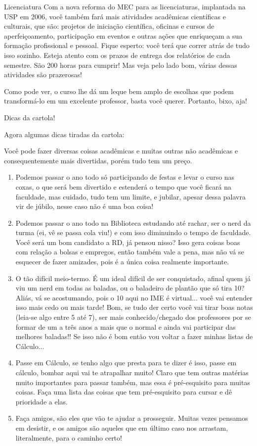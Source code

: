 \begin{subsecao}{Licenciatura}
Com a nova reforma do MEC para as licenciaturas, implantada na USP em 2006,
você também fará mais atividades acadêmicas científicas e culturais, que são:
projetos de iniciação científica, oficinas e cursos de aperfeiçoamento,
participação em eventos e outras ações que enriqueçam a sua formação
profissional e pessoal. Fique esperto: você terá que correr atrás de tudo isso
sozinho. Esteja atento com os prazos de entrega dos relatórios de cada
semestre. São 200 horas para cumprir! Mas veja pelo lado bom, várias dessas
atividades são prazerosas!

Como pode ver, o curso lhe dá um leque bem amplo de escolhas que podem
transformá-lo em um excelente professor, basta você querer. Portanto, bixo, aja!

\begin{subsubsecao}{Dicas da cartola!}

Agora algumas dicas tiradas da cartola:

Você pode fazer diversas coisas acadêmicas e muitas outras não acadêmicas e
consequentemente mais divertidas, porém tudo tem um preço.
\begin{enumerate}
\item	Podemos passar o ano todo só participando de festas e levar o curso nas
coxas, o que será bem divertido e estenderá o tempo que você ficará na
faculdade, mas cuidado, tudo tem um limite, e jubilar, apesar dessa palavra vir
de júbilo, nesse caso não é uma boa coisa!
\item	Podemos passar o ano todo na Biblioteca estudando até rachar, ser o nerd
da turma (ei, vê se passa cola viu!) e com isso diminuindo o tempo de
faculdade. Você será um bom candidato a RD, já pensou nisso? Isso gera coisas
boas com relação a bolsas e empregos, então também vale a pena, mas não vá se
esquecer de fazer amizades, pois é a única coisa realmente importante.
\item	O tão difícil meio-termo. É um ideal difícil de ser conquistado, afinal
quem já viu um nerd em todas as baladas, ou o baladeiro de plantão que só
tira 10? Aliás, vá se acostumando, pois o 10 aqui no IME é virtual... você vai
entender isso mais cedo ou mais tarde! Bom, se tudo der certo você vai tirar
boas notas (leia-se algo entre 5 até 7), ser mais conhecido/chegado dos
professores por se formar de um a três anos a mais que o normal e ainda vai
participar das melhores baladas!! Se isso não é bom então vou voltar a fazer
minhas listas de Cálculo...
\item	Passe em Cálculo, se tenho algo que presta para te dizer é isso, passe em
cálculo, bombar aqui vai te atrapalhar muito! Claro que tem outras matérias
muito importantes para passar também, mas essa é pré-esquisito para muitas
coisas. Faça uma lista das coisas que tem pré-esquisito para cursar e dê
prioridade a elas.
\item	Faça amigos, são eles que vão te ajudar a prosseguir. Muitas vezes
pensamos em desistir, e os amigos são aqueles que em último caso nos arrastam,
literalmente, para o caminho certo!


\end{enumerate}
\end{subsubsecao}
\end{subsecao}
